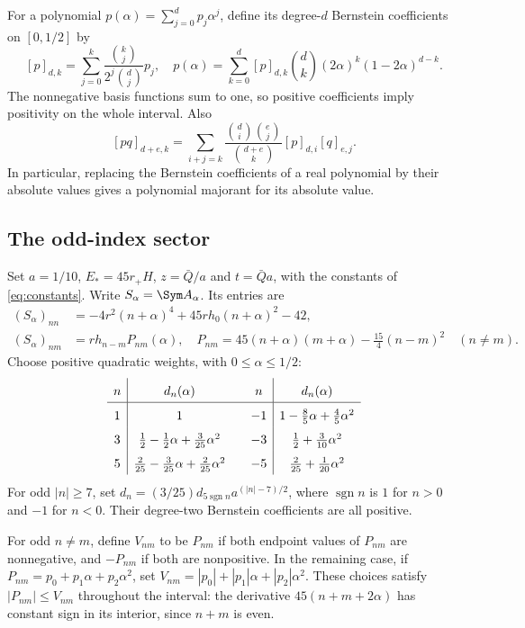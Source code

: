 For a polynomial $p(\alpha)=\sum_{j=0}^dp_j\alpha^j$, define its degree-$d$ Bernstein coefficients on $[0,1/2]$ by
\begin{equation}\label{eq:Bernstein}
 [p]_{d,k}=\sum_{j=0}^k\frac{\binom{k}{j}}{2^j\binom{d}{j}}p_j,
 \quad
 p(\alpha)=\sum_{k=0}^d[p]_{d,k}\binom dk(2\alpha)^k(1-2\alpha)^{d-k}.
\end{equation}
The nonnegative basis functions sum to one, so positive coefficients imply positivity on the whole interval. Also
\begin{equation}\label{eq:Bernstein-product}
 [pq]_{d+e,k}=\sum_{i+j=k}\frac{\binom di\binom ej}{\binom{d+e}k}
 [p]_{d,i}[q]_{e,j}.
\end{equation}
In particular, replacing the Bernstein coefficients of a real polynomial by their absolute values gives a polynomial majorant for its absolute value.

\subsection{The odd-index sector}\label{subsec:odd-bloch}
Set $a=1/10$, $E_*=45r_+H$, $z=\bar Q/a$ and $t=\bar Qa$, with the constants of \eqref{eq:constants}. Write $S_\alpha=\Sym A_\alpha$. Its entries are
\begin{align}
 (S_\alpha)_{nn}&=-4r^2(n+\alpha)^4+45rh_0(n+\alpha)^2-42,\label{eq:odd-diag}\\
 (S_\alpha)_{nm}&=rh_{n-m}P_{nm}(\alpha),\quad
 P_{nm}=45(n+\alpha)(m+\alpha)-\tfrac{15}{4}(n-m)^2\quad(n\ne m).
 \label{eq:odd-off}
\end{align}
Choose positive quadratic weights, with $0\le\alpha\le1/2$:
\begin{equation}\label{eq:odd-weights}
\renewcommand{\arraystretch}{1.6}
\begin{array}{c|c@{\qquad}c|c}
 n&d_n(\alpha)&n&d_n(\alpha)\\\hline
 1&1&-1&1-\frac85\alpha+\frac45\alpha^2\\
 3&\frac12-\frac12\alpha+\frac3{25}\alpha^2&-3&\frac12+\frac3{10}\alpha^2\\
 5&\frac2{25}-\frac3{25}\alpha+\frac2{25}\alpha^2&-5&\frac2{25}+\frac1{20}\alpha^2
\end{array}
\end{equation}
For odd $|n|\ge7$, set $d_n=(3/25)d_{5\operatorname{sgn}n}a^{(|n|-7)/2}$, where $\operatorname{sgn}n$ is $1$ for $n>0$ and $-1$ for $n<0$. Their degree-two Bernstein coefficients are all positive.

For odd $n\ne m$, define $V_{nm}$ to be $P_{nm}$ if both endpoint values of $P_{nm}$ are nonnegative, and $-P_{nm}$ if both are nonpositive. In the remaining case, if $P_{nm}=p_0+p_1\alpha+p_2\alpha^2$, set $V_{nm}=|p_0|+|p_1|\alpha+|p_2|\alpha^2$. These choices satisfy $|P_{nm}|\le V_{nm}$ throughout the interval: the derivative $45(n+m+2\alpha)$ has constant sign in its interior, since $n+m$ is even.

